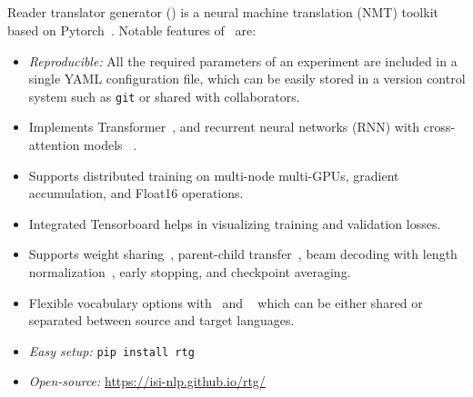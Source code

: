 \subsection{\rtg}
\label{sec:rtg}
Reader translator generator (\rtg) is a neural machine translation (NMT) toolkit based on Pytorch~\cite{NEURIPS2019_Pytorch}. 
Notable features of \rtg\ are:
\begin{itemize}[noitemsep,topsep=0pt,leftmargin=4mm]
\item \textit{Reproducible:} All the required parameters of an experiment are included in a single YAML configuration file, which can be easily stored in a version control system such as \texttt{git} or shared with collaborators.
\item Implements Transformer~\cite{vaswani2017attention}, and recurrent neural networks (RNN) with cross-attention models ~\cite{bahdanau2014nmtattn,luong2015effectiveAttn}.
\item Supports distributed training on multi-node multi-GPUs, gradient accumulation, and Float16 operations.
\item Integrated Tensorboard helps in visualizing training and validation losses. 
\item Supports weight sharing~\cite{press-wolf-2017-embeddings}, parent-child transfer~\cite{zoph-etal-2016-transfer}, beam decoding with length normalization~\cite{wu-etal-2016-GNMT}, early stopping, and checkpoint averaging. 
\item Flexible vocabulary options with \nlcodec\ and \sentpiece~\cite{kudo-richardson-2018-sentencepiece} which can be either shared or separated between source and target languages.
\item \textit{Easy setup:} \texttt{pip install rtg}
\item \textit{Open-source:} \url{https://isi-nlp.github.io/rtg/}
\end{itemize}

